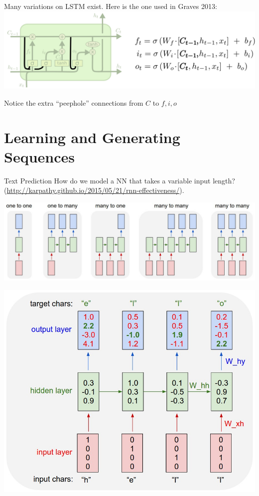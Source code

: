 \documentclass[10pt,xcolor=dvipsnames]{beamer}
\begin{document}
\begin{frame}{}
  Many variations on LSTM exist. Here is the one used
  in Graves 2013:
  \includegraphics[width=\linewidth]{fig/LSTM3-var-peepholes.png}

  Notice the extra ``peephole'' connections from
  $C$ to $f, i, o$
\end{frame}


\section{Learning and Generating Sequences}

\begin{frame}{Text Prediction}
  How do we model a NN that takes a variable input length?
  \small{(\url{http://karpathy.github.io/2015/05/21/rnn-effectiveness/}).}
  
  \vspace{1cm}
  
  \includegraphics[width=\linewidth]{fig/nn-types.jpeg}
\end{frame}

\begin{frame}{}
  \includegraphics[width=\linewidth]{fig/nn-character.jpeg}
\end{frame}
\end{document}
